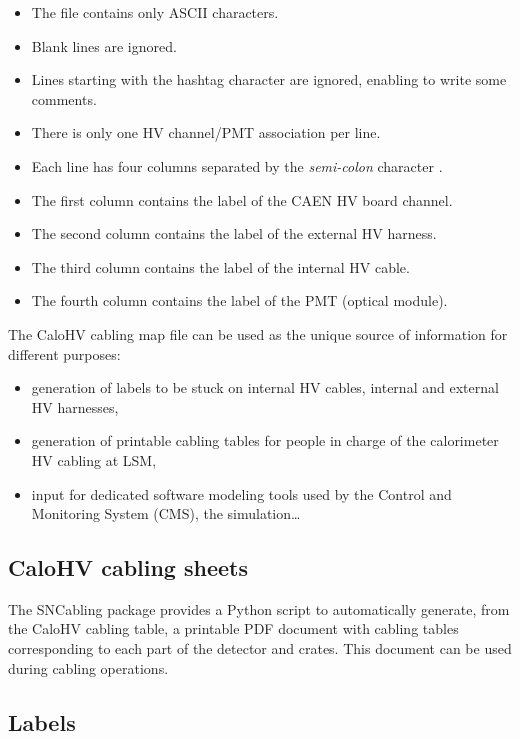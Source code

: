 \begin{itemize}
\item The file contains only ASCII characters.
\item Blank lines are ignored.
\item Lines starting with the hashtag character \fbox{\texttt{\#}} are
  ignored, enabling to write some comments.
\item There is only one HV channel/PMT association per line.
\item Each  line has  four columns  separated by  the \emph{semi-colon}
  character \fbox{\texttt{;}}.
\item The first column contains the label of the CAEN HV board channel.
\item The second column contains the label of the external HV harness.
\item The third column contains the label of the internal HV cable.
\item The fourth column contains the label of the PMT (optical module).
\end{itemize}

\par\noindent The  CaloHV cabling map file  can be used as  the unique
source of information for different purposes:
\begin{itemize}
\item generation of labels to be stuck on internal HV cables, internal
  and external HV harnesses,
\item generation of  printable cabling tables for people  in charge of
  the calorimeter HV cabling at LSM,
\item input for dedicated software  modeling tools used by the Control
  and Monitoring System (CMS), the simulation\dots
\end{itemize}


\subsection{CaloHV cabling sheets}


The  SNCabling  package  provides  a  Python  script  to  automatically
generate, from the CaloHV cabling table, a printable PDF document with
cabling  tables  corresponding to  each  part  of the  detector and crates.
This document can be used during cabling operations.


\subsection{Labels}

